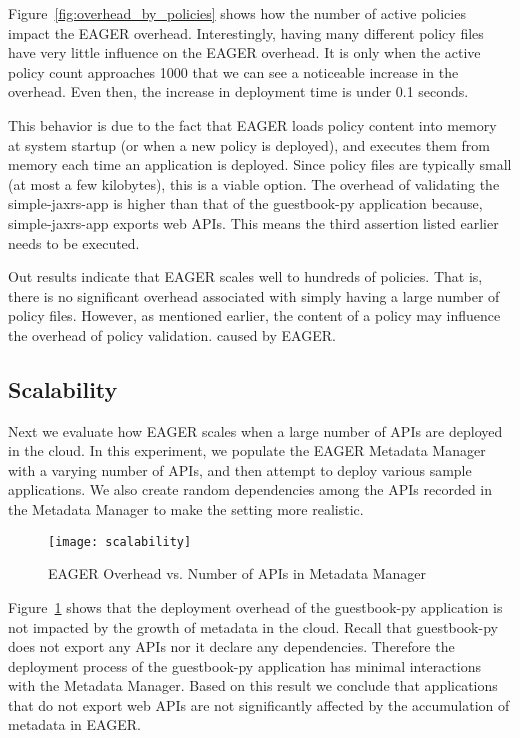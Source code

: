 Figure~\ref{fig:overhead_by_policies} shows how the number of active policies impact the EAGER overhead. Interestingly, having many
different policy files have very little influence on the EAGER overhead. It is only when the active policy count approaches 1000 that we
can see a noticeable increase in the overhead. Even then, the increase in deployment time is under 0.1 seconds. 

This behavior is due to the fact that EAGER loads policy content into memory at system
startup (or when a new policy is deployed), and executes them from memory each time an application is deployed. Since policy files are 
typically small (at most a few kilobytes), this is a viable option. The overhead of validating the simple-jaxrs-app is higher than that of the
guestbook-py application because, simple-jaxrs-app exports web APIs. This means the third assertion listed earlier
needs to be executed. 

Out results indicate that EAGER scales well to hundreds of policies. That is, there is no significant overhead associated with simply having
a large number of policy files. However, as mentioned earlier, the content of a policy may influence the overhead of policy validation.
 caused by EAGER.
 
\subsection{Scalability}
Next we evaluate how EAGER scales when a large number of APIs are deployed in the cloud. In this experiment, we populate the EAGER
Metadata Manager with a varying number of APIs, and then attempt to deploy various sample applications. We also create
random dependencies among the APIs recorded in the Metadata Manager to make the setting more realistic.

\begin{figure}
\centering
\texttt{[image: scalability]}
\caption{EAGER Overhead vs. Number of APIs in Metadata Manager}
\label{fig:scalability}
\end{figure}

Figure~\ref{fig:scalability} shows that the deployment overhead of the guestbook-py application is not impacted by the growth of metadata
in the cloud. Recall that guestbook-py does not export any APIs nor it declare any dependencies. Therefore the deployment process of
the guestbook-py application has minimal interactions with the Metadata Manager. Based on this result we conclude that applications that
do not export web APIs are not significantly affected by the accumulation of metadata in EAGER.

